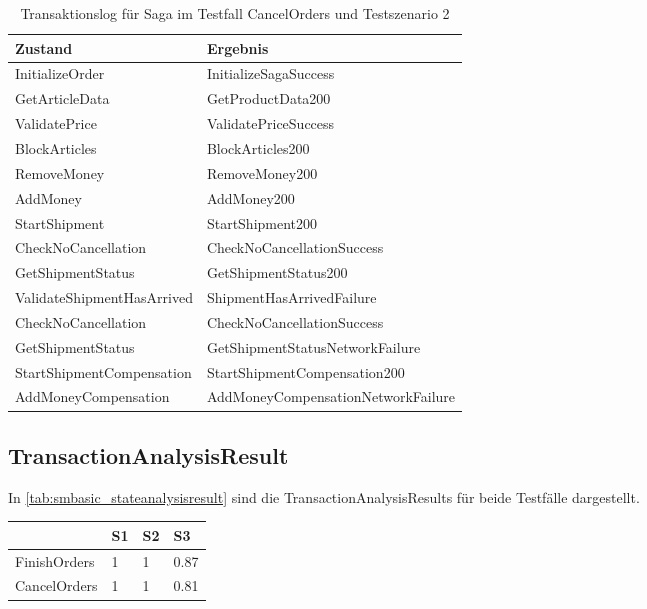\begin{center}
	\fontsize{9}{12}\selectfont
	\begin{longtable}[h]{|p{4.5cm}|p{7cm}|}
		\hline
		Zustand & Ergebnis \\* \hline
		\endhead
		\hline
		\caption{Transaktionslog für Saga im Testfall CancelOrders und Testszenario 2}
		\label{tab:transaktionslog_ts2_cancelorders_smbasic}
		\endfoot
		InitializeOrder &  InitializeSagaSuccess \\* \hline
		GetArticleData &  GetProductData200 \\* \hline
		ValidatePrice &  ValidatePriceSuccess \\* \hline
		BlockArticles &  BlockArticles200 \\* \hline
		RemoveMoney &  RemoveMoney200 \\* \hline
		AddMoney &  AddMoney200 \\* \hline
		StartShipment &  StartShipment200 \\* \hline
		CheckNoCancellation &  CheckNoCancellationSuccess \\* \hline
		GetShipmentStatus &  GetShipmentStatus200 \\* \hline
		\rowcolor{Gray}
		ValidateShipmentHasArrived &  ShipmentHasArrivedFailure \\* \hline
		CheckNoCancellation &  CheckNoCancellationSuccess \\* \hline
		GetShipmentStatus &  GetShipmentStatusNetworkFailure \\* \hline
		StartShipmentCompensation &  StartShipmentCompensation200 \\* \hline
		\rowcolor{Gray}
		AddMoneyCompensation &  AddMoneyCompensationNetworkFailure \\* \hline
	\end{longtable}
\end{center}
\FloatBarrier

\subsection{TransactionAnalysisResult}
In \cref{tab:smbasic_stateanalysisresult} sind die TransactionAnalysisResults für beide Testfälle dargestellt. 

\begin{center}
	\fontsize{9}{12}\selectfont
	\begin{longtable}[h]{|p{5cm}|p{1cm}|p{1cm}|p{1cm}|}
		\hline
		 & S1 & S2 & S3 \\ \hline
		\endhead
		\endfoot
		FinishOrders & 1 & 1 & 0.87\\ \hline	
		CancelOrders & 1 & 1 & 0.81\\ \hline
	\end{longtable}
\end{center}
\FloatBarrier


